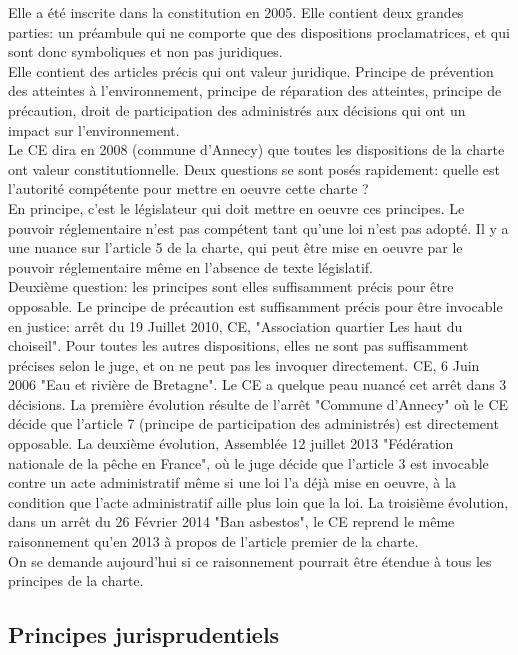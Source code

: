 \documentclass[10pt, a4paper, openany]{book}
\begin{document}
Elle a été inscrite dans la constitution en 2005. Elle contient deux grandes parties: un préambule qui ne comporte que des dispositions proclamatrices, et qui sont donc symboliques et non pas juridiques. \\
Elle contient des articles précis qui ont valeur juridique. Principe de prévention des atteintes à l'environnement, principe de réparation des atteintes, principe de précaution, droit de participation des administrés aux décisions qui ont un impact sur l'environnement. \\
Le CE dira en 2008 (commune d'Annecy) que toutes les dispositions de la charte ont valeur constitutionnelle. Deux questions se sont posés rapidement: quelle est l'autorité compétente pour mettre en oeuvre cette charte ? \\
En principe, c'est le législateur qui doit mettre en oeuvre ces principes. Le pouvoir réglementaire n'est pas compétent tant qu'une loi n'est pas adopté. Il y a une nuance sur l'article 5 de la charte, qui peut être mise en oeuvre par le pouvoir réglementaire même en l'absence de texte législatif. \\
Deuxième question: les principes sont elles suffisamment précis pour être opposable. Le principe de précaution est suffisamment précis pour être invocable en justice: arrêt du 19 Juillet 2010, CE, "Association quartier Les haut du choiseil". Pour toutes les autres dispositions, elles ne sont pas suffisamment précises selon le juge, et on ne peut pas les invoquer directement. CE, 6 Juin 2006 "Eau et rivière de Bretagne". Le CE a quelque peau nuancé cet arrêt dans 3 décisions. La première évolution résulte de l'arrêt "Commune d'Annecy" où le CE décide que l'article 7 (principe de participation des administrés) est directement opposable. La deuxième évolution, Assemblée 12 juillet 2013 "Fédération nationale de la pêche en France", où le juge décide que l'article 3 est invocable contre un acte administratif même si une loi l'a déjà mise en oeuvre, à la condition que l'acte administratif aille plus loin que la loi. La troisième évolution, dans un arrêt du 26 Février 2014 "Ban asbestos", le CE reprend le même raisonnement qu'en 2013 à propos de l'article premier de la charte. \\
On se demande aujourd'hui si ce raisonnement pourrait être étendue à tous les principes de la charte. 

\subsection{Principes jurisprudentiels}
\end{document}
